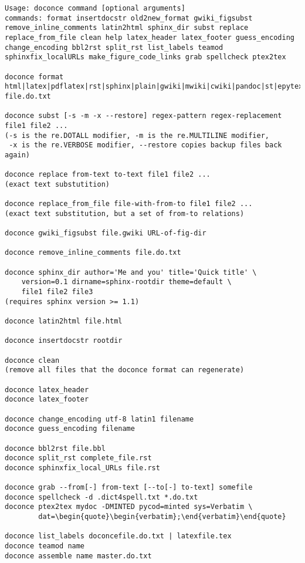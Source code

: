 \documentclass[twoside]{article}
\begin{document}
\begin{Verbatim}
Usage: doconce command [optional arguments]
commands: format insertdocstr old2new_format gwiki_figsubst remove_inline_comments latin2html sphinx_dir subst replace replace_from_file clean help latex_header latex_footer guess_encoding change_encoding bbl2rst split_rst list_labels teamod sphinxfix_localURLs make_figure_code_links grab spellcheck ptex2tex

doconce format html|latex|pdflatex|rst|sphinx|plain|gwiki|mwiki|cwiki|pandoc|st|epytext file.do.txt

doconce subst [-s -m -x --restore] regex-pattern regex-replacement file1 file2 ...
(-s is the re.DOTALL modifier, -m is the re.MULTILINE modifier,
 -x is the re.VERBOSE modifier, --restore copies backup files back again)

doconce replace from-text to-text file1 file2 ...
(exact text substutition)

doconce replace_from_file file-with-from-to file1 file2 ...
(exact text substitution, but a set of from-to relations)

doconce gwiki_figsubst file.gwiki URL-of-fig-dir

doconce remove_inline_comments file.do.txt

doconce sphinx_dir author='Me and you' title='Quick title' \
    version=0.1 dirname=sphinx-rootdir theme=default \
    file1 file2 file3
(requires sphinx version >= 1.1)

doconce latin2html file.html

doconce insertdocstr rootdir

doconce clean
(remove all files that the doconce format can regenerate)

doconce latex_header
doconce latex_footer

doconce change_encoding utf-8 latin1 filename
doconce guess_encoding filename

doconce bbl2rst file.bbl
doconce split_rst complete_file.rst
doconce sphinxfix_local_URLs file.rst

doconce grab --from[-] from-text [--to[-] to-text] somefile
doconce spellcheck -d .dict4spell.txt *.do.txt
doconce ptex2tex mydoc -DMINTED pycod=minted sys=Verbatim \
        dat=\begin{quote}\begin{verbatim};\end{verbatim}\end{quote}

doconce list_labels doconcefile.do.txt | latexfile.tex
doconce teamod name
doconce assemble name master.do.txt
\end{Verbatim}
\end{document}
